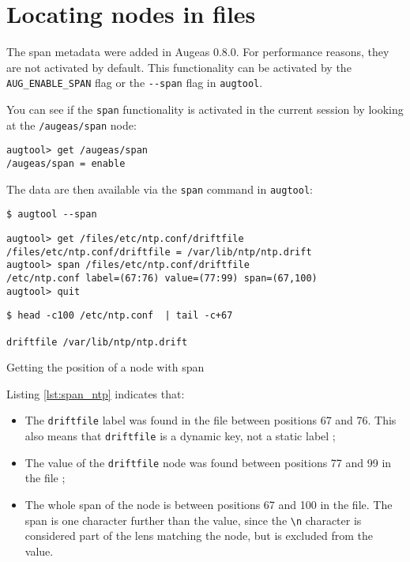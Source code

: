 \section{Locating nodes in files}

\label{sec:locating_nodes}  

The span metadata were added in Augeas 0.8.0. For performance reasons, they are not activated by default. This functionality can be activated by the \verb!AUG_ENABLE_SPAN! flag or the \verb!--span! flag in \verb!augtool!.

You can see if the \verb!span! functionality is activated in the current session by looking at the \verb!/augeas/span! node:


\begin{verbatim}
augtool> get /augeas/span
/augeas/span = enable
\end{verbatim}

The data are then available via the \verb!span! command in \verb!augtool!:


\begin{listing}
  \begin{verbatim}
$ augtool --span
  \end{verbatim}
  \begin{verbatim}
augtool> get /files/etc/ntp.conf/driftfile
/files/etc/ntp.conf/driftfile = /var/lib/ntp/ntp.drift
augtool> span /files/etc/ntp.conf/driftfile
/etc/ntp.conf label=(67:76) value=(77:99) span=(67,100)
augtool> quit
  \end{verbatim}
  \begin{verbatim}
$ head -c100 /etc/ntp.conf  | tail -c+67

driftfile /var/lib/ntp/ntp.drift
  \end{verbatim}
  \caption{Getting the position of a node with span}
  \label{lst:span_ntp}
\end{listing}

Listing \ref{lst:span_ntp} indicates that:

\begin{itemize}
\item
  The \verb!driftfile! label was found in the file between positions 67 and 76. This also means that \verb!driftfile! is a dynamic key, not a static label ;
\item
  The value of the \verb!driftfile! node was found between positions 77 and 99 in the file ;
\item
  The whole span of the node is between positions 67 and 100 in the file. The span is one character further than the value, since the \verb!\n! character is considered part of the lens matching the node, but is excluded from the value.
\end{itemize}

